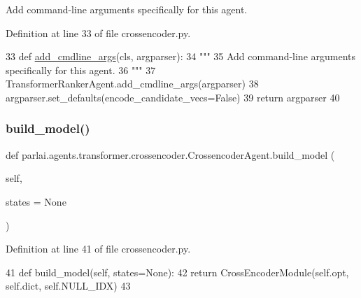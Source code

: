 \begin{DoxyVerb}Add command-line arguments specifically for this agent.
\end{DoxyVerb}
 

Definition at line 33 of file crossencoder.\+py.


\begin{DoxyCode}
33     \textcolor{keyword}{def }\hyperlink{namespaceparlai_1_1agents_1_1drqa_1_1config_a62fdd5554f1da6be0cba185271058320}{add\_cmdline\_args}(cls, argparser):
34         \textcolor{stringliteral}{"""}
35 \textcolor{stringliteral}{        Add command-line arguments specifically for this agent.}
36 \textcolor{stringliteral}{        """}
37         TransformerRankerAgent.add\_cmdline\_args(argparser)
38         argparser.set\_defaults(encode\_candidate\_vecs=\textcolor{keyword}{False})
39         \textcolor{keywordflow}{return} argparser
40 
\end{DoxyCode}
\mbox{\label{classparlai_1_1agents_1_1transformer_1_1crossencoder_1_1CrossencoderAgent_af63326f1f4d295e7a1a7fad4b07e077d}} 
\subsubsection{\texorpdfstring{build\+\_\+model()}{build\_model()}}
{\footnotesize\ttfamily def parlai.\+agents.\+transformer.\+crossencoder.\+Crossencoder\+Agent.\+build\+\_\+model (\begin{DoxyParamCaption}\item[{}]{self,  }\item[{}]{states = {\ttfamily None} }\end{DoxyParamCaption})}



Definition at line 41 of file crossencoder.\+py.


\begin{DoxyCode}
41     \textcolor{keyword}{def }build\_model(self, states=None):
42         \textcolor{keywordflow}{return} CrossEncoderModule(self.opt, self.dict, self.NULL\_IDX)
43 
\end{DoxyCode}
\mbox{\label{classparlai_1_1agents_1_1transformer_1_1crossencoder_1_1CrossencoderAgent_a5c286ce0bc163e443e73182f95d6e0c6}} 

